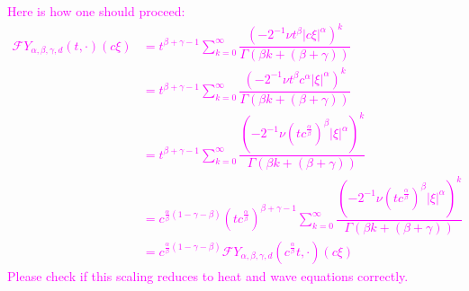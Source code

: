 \documentclass[a4paper,11pt]{article}
\numberwithin{equation}{section}
\theoremstyle{plain}
\theoremstyle{definition}
\numberwithin{NQ}{section}
\numberwithin{LQ}{section}
\numberwithin{ZQ}{section}
\begin{document}
	\bigskip
	\textcolor{magenta}{
		Here is how one should proceed:
		\begin{align*}
		\mathcal{F}Y_{\alpha, \beta, \gamma, d}(t, \cdot)(c\xi) & = t^{\beta + \gamma -1} \sum_{k=0}^\infty \dfrac{\left(-2^{-1}\nu t^\beta |c\xi|^\alpha\right)^k}{\Gamma\left(\beta k + (\beta + \gamma)\right)} \\
		& = t^{\beta + \gamma -1} \sum_{k=0}^\infty \dfrac{\left(-2^{-1}\nu t^\beta c^\alpha |\xi|^\alpha\right)^k}{\Gamma\left(\beta k + (\beta + \gamma)\right)}\\
		& = t^{\beta + \gamma -1} \sum_{k=0}^\infty \dfrac{\left(-2^{-1}\nu (tc^{\frac{\alpha}{\beta}})^\beta |\xi|^\alpha\right)^k}{\Gamma\left(\beta k + (\beta + \gamma)\right)}\\
		& =c^{\frac{\alpha}{\beta}(1-\gamma-\beta)} (tc^{\frac{\alpha}{\beta}})^{\beta + \gamma -1} \sum_{k=0}^\infty \dfrac{\left(-2^{-1}\nu (tc^{\frac{\alpha}{\beta}})^\beta |\xi|^\alpha\right)^k}{\Gamma\left(\beta k + (\beta + \gamma)\right)}\\
		& =c^{\frac{\alpha}{\beta}(1-\gamma-\beta)} \mathcal{F}Y_{\alpha, \beta, \gamma, d}\left(c^{\frac{\alpha}{\beta}}t, \cdot\right)(c\xi)
		\end{align*}
		Please check if this scaling reduces to heat and wave equations correctly.}
\end{document}
